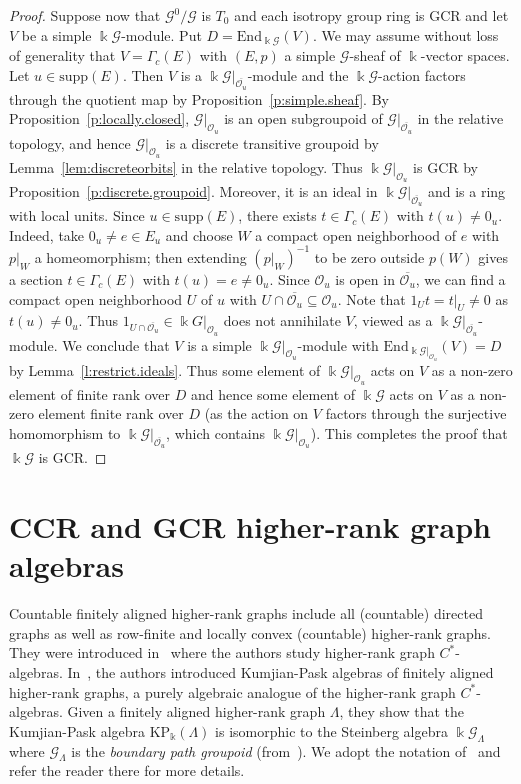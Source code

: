 \documentclass[11pt,reqno]{amsart}
\theoremstyle{plain}
\numberwithin{equation}{section}
\newcommand{\G}[0]{\mathscr{G}}
\newcommand{\orb}[0]{\mathcal{O}}
\begin{document}
\begin{proof}
Suppose now that $\mathscr G^0/\G$ is $T_0$ and each isotropy group ring is GCR and let $V$ be a simple $\Bbbk\G$-module. Put $D=\mathrm{End}_{\Bbbk\G}(V)$.  We may assume without loss of generality that $V=\Gamma_c(E)$ with $(E,p)$ a simple $\mathscr G$-sheaf of $\Bbbk$-vector spaces.  Let $u\in \mathrm{supp}(E)$.  Then $V$ is a $\Bbbk \mathscr G|_{\overline{\orb_u}}$-module and the $\Bbbk\mathscr G$-action factors through the quotient map by Proposition~\ref{p:simple.sheaf}.  By Proposition~\ref{p:locally.closed}, $\mathscr G|_{\orb_u}$ is an open subgroupoid of $\mathscr G|_{\overline{\orb_u}}$ in the relative topology, and hence  $\mathscr G|_{\orb_u}$ is a discrete transitive groupoid by Lemma~\ref{lem:discreteorbits} in the relative topology.  Thus $\Bbbk\mathscr G|_{\orb_u}$ is GCR by Proposition~\ref{p:discrete.groupoid}.  Moreover, it is an ideal in $\Bbbk \mathscr G|_{\overline{\orb_u}}$ and is a ring with local units. Since $u\in \mathrm{supp}(E)$, there exists $t\in \Gamma_c(E)$ with $t(u)\neq 0_u$. Indeed, take $0_u\neq e\in E_u$ and choose $W$ a compact open neighborhood of $e$ with $p|_W$ a homeomorphism; then extending $(p|_W)^{-1}$ to be zero outside $p(W)$ gives a section $t\in \Gamma_c(E)$ with $t(u)=e\neq 0_u$.  Since $\orb_u$ is open in $\overline{\orb_u}$, we can find a compact open neighborhood $U$ of $u$ with $U\cap \overline{\orb_u}\subseteq \orb_u$.  Note that $1_Ut = t|_U\neq 0$ as $t(u)\neq 0_u$.  Thus $1_{U\cap \overline{\orb_u}}\in \Bbbk G|_{\orb_u}$ does not annihilate $V$, viewed as a $\Bbbk \mathscr G|_{\overline{\orb_u}}$-module.  We conclude that $V$ is a simple $\Bbbk \mathscr G|_{\orb_u}$-module with $\mathrm{End}_{\Bbbk \mathscr G|_{\orb_u}}(V)=D$ by Lemma~\ref{l:restrict.ideals}.  Thus some element of $\Bbbk \mathscr G|_{\orb_u}$ acts on $V$ as a non-zero element of finite rank over $D$ and hence some element of $\Bbbk \G$ acts on $V$ as a non-zero element finite rank over $D$ (as the action on $V$ factors through the surjective homomorphism to $\Bbbk\mathscr G|_{\overline{\orb_u}}$, which contains $\Bbbk \G|_{\orb_u}$).  This completes the proof that $\Bbbk \G$ is GCR.
\end{proof}



\section{CCR and GCR higher-rank graph algebras}\label{sec:higerRankgraphs}
Countable finitely aligned higher-rank graphs include all (countable) directed graphs as well as row-finite and locally convex (countable) higher-rank graphs.  They were introduced in~\cite{RSY04} where  the authors study higher-rank graph $C^*$-algebras.
In~\cite{CP17}, the authors introduced Kumjian-Pask algebras of finitely aligned higher-rank graphs, a purely algebraic analogue of the higher-rank graph $C^*$-algebras.   Given a finitely aligned higher-rank graph $\Lambda$, they show that the Kumjian-Pask algebra KP$_{\Bbbk}(\Lambda)$ is isomorphic to the Steinberg algebra
$\Bbbk\G_{\Lambda}$ where $\G_{\Lambda}$ is
the \emph{boundary path groupoid} (from~\cite{Y07}).  We adopt the notation of~\cite{CP17} and refer the reader there for more details.
\end{document}

